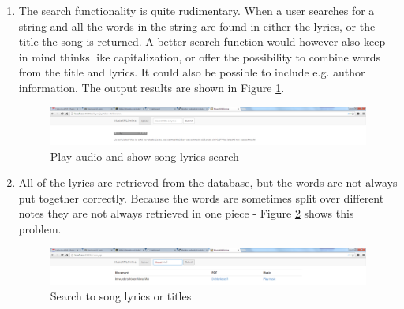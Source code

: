\documentclass[MusicXML.tex]{subfiles}
\begin{document}
\begin{enumerate}
\item The search functionality is quite rudimentary. When a user searches for a string and all the words in the string are found in either the lyrics, or the title the song is returned. A better search function would however also keep in mind thinks like capitalization, or offer the possibility to combine words from the title and lyrics. It could also be possible to include e.g. author information. The output results are shown in Figure \ref{fig:musicplay}.

\begin{figure} [H]
	\centering
	\includegraphics[width=1\textwidth]{./Figures/MusicXMLOnline-player.png}
	\caption{Play audio and show song lyrics search}
	\label{fig:musicplay}
\end{figure}

\item All of the lyrics are retrieved from the database, but the words are not always put together correctly. Because the words are sometimes split over different notes they are not always retrieved in one piece - Figure \ref{fig:musiclyricssearch} shows this problem.

\begin{figure} [H]
	\centering
	\includegraphics[width=1\textwidth]{./Figures/MusicXMLOnline-search.png}
	\caption{Search to song lyrics or titles}
	\label{fig:musiclyricssearch}
\end{figure}

\end{enumerate}
\end{document}
